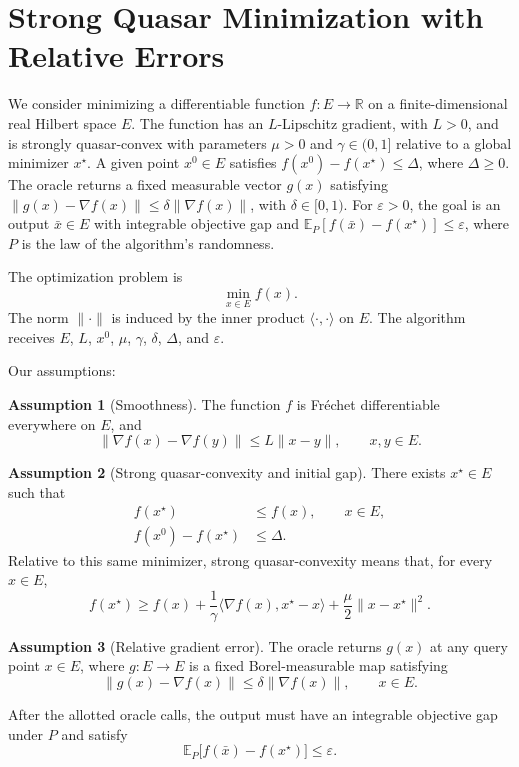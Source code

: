 \documentclass[10pt]{article}
\theoremstyle{definition}
\newtheorem{assumption}{Assumption}
\begin{document}
\section*{Strong Quasar Minimization with Relative Errors}
We consider minimizing a differentiable function $f:E\to\mathbb{R}$ on a finite-dimensional real Hilbert space $E$. The function has an $L$-Lipschitz gradient, with $L>0$, and is strongly quasar-convex with parameters $\mu>0$ and $\gamma\in(0,1]$ relative to a global minimizer $x^\star$. A given point $x^0\in E$ satisfies $f(x^0)-f(x^\star)\leq\Delta$, where $\Delta\geq0$. The oracle returns a fixed measurable vector $g(x)$ satisfying $\|g(x)-\nabla f(x)\|\leq\delta\|\nabla f(x)\|$, with $\delta\in[0,1)$. For $\varepsilon>0$, the goal is an output $\bar{x}\in E$ with integrable objective gap and $\mathbb{E}_{P}[f(\bar{x})-f(x^\star)]\leq\varepsilon$, where $P$ is the law of the algorithm's randomness.

The optimization problem is
\[
\min_{x\in E} f(x).
\]
The norm $\|\cdot\|$ is induced by the inner product $\langle\cdot,\cdot\rangle$ on $E$. The algorithm receives $E$, $L$, $x^0$, $\mu$, $\gamma$, $\delta$, $\Delta$, and $\varepsilon$.

Our assumptions:
\begin{assumption}[Smoothness]
The function $f$ is Fr\'echet differentiable everywhere on $E$, and
\[
\|\nabla f(x)-\nabla f(y)\|\leq L\|x-y\|,
\qquad x,y\in E.
\]
\end{assumption}

\begin{assumption}[Strong quasar-convexity and initial gap]
There exists $x^\star\in E$ such that
\[
\begin{aligned}
f(x^\star)&\leq f(x), \qquad x\in E,\\
f(x^0)-f(x^\star)&\leq\Delta.
\end{aligned}
\]
Relative to this same minimizer, strong quasar-convexity means that, for every $x\in E$,
\[
f(x^\star)\geq f(x)
+\frac{1}{\gamma}\langle\nabla f(x),x^\star-x\rangle
+\frac{\mu}{2}\|x-x^\star\|^2.
\]
\end{assumption}

\begin{assumption}[Relative gradient error]
The oracle returns $g(x)$ at any query point $x\in E$, where $g:E\to E$ is a fixed Borel-measurable map satisfying
\[
\|g(x)-\nabla f(x)\|\leq\delta\|\nabla f(x)\|,
\qquad x\in E.
\]
\end{assumption}

After the allotted oracle calls, the output must have an integrable objective gap under $P$ and satisfy
\[
\mathbb{E}_{P}\bigl[f(\bar{x})-f(x^\star)\bigr]\leq\varepsilon.
\]
\end{document}

